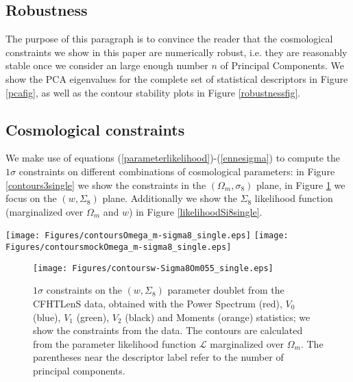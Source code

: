 \documentclass[reprint,aps,prd,superscriptaddress,showkeys,showpacs]{revtex4-1}
\begin{document}
\subsection{Robustness}
%
The purpose of this paragraph is to convince the reader that the cosmological constraints we show in this paper are numerically robust, i.e. they are reasonably stable once we consider an large enough number $n$ of Principal Components. We show the PCA eigenvalues for the complete set of statistical descriptors in Figure \ref{pcafig}, as well as the contour stability plots in Figure \ref{robustnessfig}. 
\subsection{Cosmological constraints}
%
We make use of equations (\ref{parameterlikelihood})-(\ref{ennesigma}) to compute the $1\sigma$ constraints on different combinations of cosmological parameters: in Figure \ref{contours3single} we show the constraints in the $(\Omega_m,\sigma_8)$ plane, in Figure \ref{contours3singleRep} we focus on the $(w,\Sigma_8)$ plane. Additionally we show the $\Sigma_8$ likelihood function (marginalized over $\Omega_m$ and $w$) in Figure \ref{likelihoodSi8single}.

\begin{figure*}
\begin{center}
\texttt{[image: Figures/contoursOmega\_m-sigma8\_single.eps]}
\texttt{[image: Figures/contoursmockOmega\_m-sigma8\_single.eps]}
\end{center}
\caption{$1\sigma$ constraints on the $(\Omega_m,\sigma_8)$ parameter doublet using the Power Spectrum (red), $V_0$ (blue), $V_1$ (green), $V_2$ (black) and Moments (orange) statistics; we show the constraints from the data (left panel) and from a mock observation constructed using the CFHTcov simulations as data (right panel). The contours are calculated from the parameter likelihood function $\mathcal{L}$ marginalized over $w$. The parentheses near the descriptor label refer to the number of principal components.}
\label{contours3single}
\end{figure*}

\begin{figure}
\begin{center}
\texttt{[image: Figures/contoursw-Sigma8Om055\_single.eps]}
\end{center}
\caption{$1\sigma$ constraints on the $(w,\Sigma_8)$ parameter doublet from the CFHTLenS data, obtained with the Power Spectrum (red), $V_0$ (blue), $V_1$ (green), $V_2$ (black) and Moments (orange) statistics; we show the constraints from the data. The contours are calculated from the parameter likelihood function $\mathcal{L}$ marginalized over $\Omega_m$. The parentheses near the descriptor label refer to the number of principal components.}
\label{contours3singleRep}
\end{figure}
\end{document}
